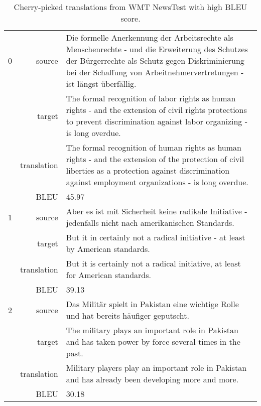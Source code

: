 \begin{table}[h]
\centering
\begin{tabular}{l|r|p{10cm}}
0 & source & Die formelle Anerkennung der Arbeitsrechte als Menschenrechte - und die Erweiterung des Schutzes der Bürgerrechte als Schutz gegen Diskriminierung bei der Schaffung von Arbeitnehmervertretungen - ist längst überfällig. \\[0.1cm]
& target & The formal recognition of labor rights as human rights - and the extension of civil rights protections to prevent discrimination against labor organizing - is long overdue. \\[0.1cm]
& translation & The formal recognition of human rights as human rights - and the extension of the protection of civil liberties as a protection against discrimination against employment organizations - is long overdue. \\[0.1cm]
& BLEU & 45.97 \\[0.1cm] \hline

1 & source & Aber es ist mit Sicherheit keine radikale Initiative - jedenfalls nicht nach amerikanischen Standards. \\[0.1cm]
& target & But it in certainly not a radical initiative - at least by American standards. \\[0.1cm]
& translation & But it is certainly not a radical initiative, at least for American standards. \\[0.1cm]
& BLEU & 39.13 \\[0.1cm] \hline

2 & source & Das Militär spielt in Pakistan eine wichtige Rolle und hat bereits häufiger geputscht. \\[0.1cm]
& target & The military plays an important role in Pakistan and has taken power by force several times in the past. \\[0.1cm]
& translation & Military players play an important role in Pakistan and has already been developing more and more. \\[0.1cm]
& BLEU & 30.18
\end{tabular}
\caption{Cherry-picked translations from WMT NewsTest with high BLEU score.}
\label{table:result:bytenet:high-belu}
\end{table}

